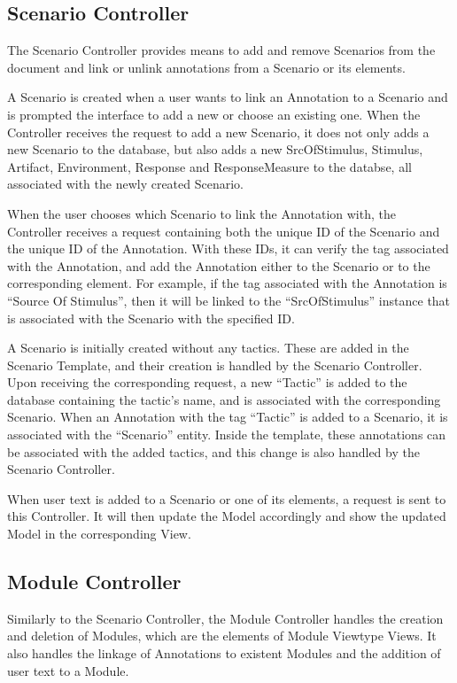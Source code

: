  
\subsection{Scenario Controller}

The Scenario Controller provides means to add and remove Scenarios from the document and link or unlink annotations from a Scenario or its elements.

A Scenario is created when a user wants to link an Annotation to a Scenario and is prompted the interface to add a new or choose an existing one. When the Controller receives the request to add a new Scenario, it does not only adds a new Scenario to the database, but also adds a new SrcOfStimulus, Stimulus, Artifact, Environment, Response and ResponseMeasure to the databse, all associated with the newly created Scenario. 

When the user chooses which Scenario to link the Annotation with, the Controller receives a request containing both the unique ID of the Scenario and the unique ID of the Annotation. With these IDs, it can verify the tag associated with the Annotation, and add the Annotation either to the Scenario or to the corresponding element. For example, if the tag associated with the Annotation is ``Source Of Stimulus'', then it will be linked to the ``SrcOfStimulus'' instance that is associated with the Scenario with the specified ID.

A Scenario is initially created without any tactics. These are added in the Scenario Template, and their creation is handled by the Scenario Controller. Upon receiving the corresponding request, a new ``Tactic'' is added to the database containing the tactic's name, and is associated with the corresponding Scenario. When an Annotation with the tag ``Tactic'' is added to a Scenario, it is associated with the ``Scenario'' entity. Inside the template, these annotations can be associated with the added tactics, and this change is also handled by the Scenario Controller. 

When user text is added to a Scenario or one of its elements, a request is sent to this Controller. It will then update the Model accordingly and show the updated Model in the corresponding View.

\subsection{Module Controller}

Similarly to the Scenario Controller, the Module Controller handles the creation and deletion of Modules, which are the elements of Module Viewtype Views. It also handles the linkage of Annotations to existent Modules and the addition of user text to a Module.

